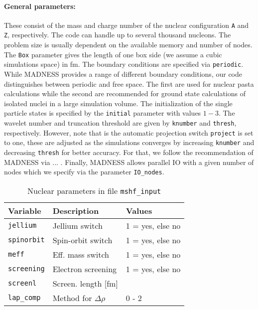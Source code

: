 \documentclass[3p]{elsarticle}
\begin{document}
\paragraph{General parameters:} These consist of the mass and charge number of the nuclear configuration {\tt A} and {\tt Z}, respectively. The code can handle up to several thousand nucleons. The problem size is usually dependent on the available memory and number of nodes. The {\tt Box} parameter gives the length of one box side (we assume a cubic simulations space) in fm. The boundary conditions are specified via {\tt periodic}. While {\sc MADNESS} provides a range of different boundary conditions, our code distinguishes between periodic and free space. The first are used for nuclear pasta calculations while the second are recommended for ground state calculations of isolated nuclei in a large simulation volume. The initialization of the single particle states is specified by the {\tt initial} parameter with values $1-3$. The wavelet number and truncation threshold are given by {\tt knumber} and {\tt thresh}, respectively. However, note that is the automatic projection switch {\tt project} is set to one, these are adjusted as the simulations converges by increasing {\tt knumber} and decreasing {\tt thresh} for better accuracy. For that, we follow the recommendation of {\sc MADNESS} via ... . Finally, {\sc MADNESS} allows parallel IO with a given number of nodes which we specify via the parameter {\tt IO\_nodes}.
\begin{table}
\caption{Nuclear parameters in file \texttt{mshf\_input}}
\begin{tabular*}{\columnwidth}{ l l l}
\hline
\hline
Variable & Description & Values\\
\hline
\texttt{jellium}              & Jellium switch                & 1 = yes, else no\\
\texttt{spinorbit}           & Spin-orbit switch                               & 1 = yes, else no\\
\texttt{meff}                  & Eff. mass switch                   & 1 = yes, else no\\
\texttt{screening}         & Electron screening                            & 1 = yes, else no\\
\texttt{screenl}             & Screen. length [fm]                         &  \\
\texttt{lap\_comp}         & Method for $\Delta \rho$                & 0 - 2 \\
\hline
\hline
\end{tabular*}
\label{table2}
\end{table}
\end{document}
